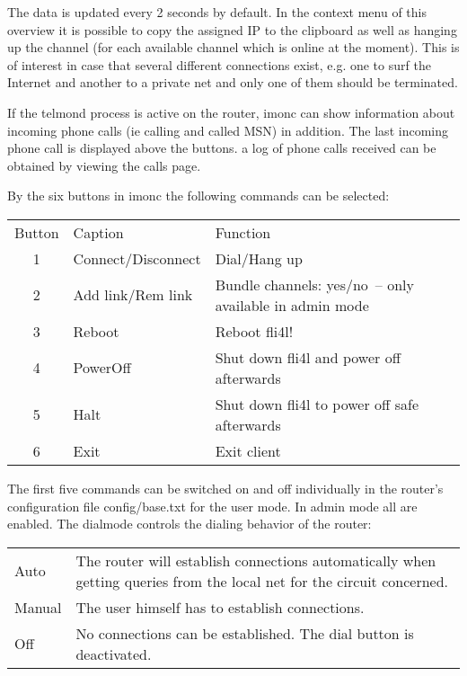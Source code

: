   \medskip

  The data is updated every 2 seconds by default. In the context menu of
  this overview it is possible to copy the assigned IP to the clipboard
  as well as hanging up the channel (for each available channel which is
  online at the moment). This is of interest in case that several different
  connections exist, e.g. one to surf the Internet and another to a private
  net and only one of them should be terminated.

  If the telmond process is active on the router, imonc can show information
  about incoming phone calls (ie calling and called MSN) in addition. The last
  incoming phone call is displayed above the buttons. a log of phone calls received
  can be obtained by viewing the calls page.

  By the six buttons in imonc the following commands can be selected:

  \begin{tabular}{clp{9cm}}
    Button & Caption & Function \\
    1& Connect/Disconnect &   Dial/Hang up\\
    2& Add link/Rem link  &   Bundle channels: yes/no~-- only available in admin mode\\
    3& Reboot             &   Reboot fli4l!\\
    4& PowerOff           & Shut down fli4l and power off afterwards\\
    5& Halt               & Shut down fli4l to power off safe afterwards\\
    6& Exit               & Exit client\\
  \end{tabular}

  \medskip

  \noindent The first five commands can be switched on and off individually in the
  router's configuration file config/base.txt for the user mode. In admin mode all
  are enabled. The dialmode controls the dialing behavior of the router:

  \begin{tabular}{lp{9cm}}
    Auto  & The router will establish connections automatically when getting 
    queries from the local net for the circuit concerned.\\
    Manual & The user himself has to establish connections.\\
    Off   & No connections can be established. The dial button is deactivated.\\
  \end{tabular}

